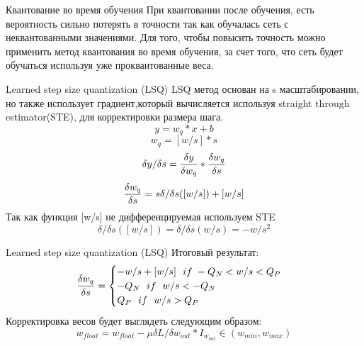 \documentclass{beamer}
\begin{document}
\begin{frame}{Квантование во время обучения}
При квантовании после обучения, есть вероятность сильно потерять в точности так как обучалась сеть с неквантованными значениями. Для того, чтобы повысить точность можно применить метод квантования во время обучения, за счет того, что сеть будет обучаться используя уже проквантованные веса.
\end{frame}

\begin{frame}{Learned step size quantization (LSQ)}
LSQ метод основан на s масштабировании, но также использует градиент,который вычисляется используя straight through estimator(STE), для корректировки размера шага.  
$$y = w_q*x + b $$
$$w_q = [w/s]*s $$
$$\delta y/\delta s = {\delta y \over \delta w_q}*{\delta w_q \over \delta s}$$  
$${\delta w_q \over \delta s} = s \delta/\delta s ([w/s]) + [w/s] $$
Так как функция [w/s] не дифференцируемая  используем STE  
$$\delta/\delta s ([w/s]) = \delta /\delta s (w/s) = -w/s^2$$
\end{frame}
\begin{frame}{Learned step size quantization (LSQ)}
Итоговый результат:  
\begin{equation}
{\delta w_q \over \delta s} = 
\begin{cases}
    -w/s + [w/s] \ \ if  \ -Q_N < w/s <Q_P
    \\
    -Q_N \ \ if \ \ w/s < -Q_N
    \\
    Q_P \ \ if \ \ w/s  > Q_P
    \end{cases}
\end{equation} 
Корректировка весов будет выглядеть следующим образом:
$$w_{float} = w_{float} - \mu \delta L/\delta w_{out}*I_{w_{out}} \in (w_{min},w_{max})$$
\end{frame}
\end{document}
